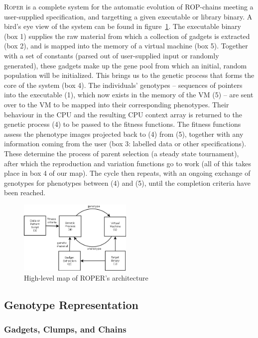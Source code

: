 \textsc{Roper} is a complete system for the automatic evolution of
ROP-chains meeting a user-supplied specification, and targetting a
given executable or library binary. A bird's eye view of the system
can be found in figure~\ref{fig:architecture}. The executable binary
(box 1) supplies the raw material from which a collection of gadgets
is extracted (box 2), and is mapped into the memory of a virtual
machine (box 5). Together with a set of constants (parsed out of
user-supplied input or randomly generated), these gadgets make up the
gene pool from which an initial, random population will be
initialized. This brings us to the genetic process that forms the core
of the system (box 4). The individuals' genotypes -- sequences of
pointers into the executable (1), which now exists in the memory of
the VM (5) -- are sent over to the VM to be mapped into their
corresponding phenotypes. Their behaviour in the CPU and the resulting
CPU context array is returned to the genetic process (4) to be passed
to the fitness functions. The fitness functions assess the phenotype
images projected back to (4) from (5), together with any information
coming from the user (box 3: labelled data or other specifications).
These determine the process of parent selection (a steady state
tournament), after which the reproduction and variation functions go
to work (all of this takes place in box 4 of our map). The cycle then
repeats, with an ongoing exchange of genotypes for phenotypes between
(4) and (5), until the completion criteria have been reached.

\begin{figure}
  \includegraphics[width=\columnwidth,height=3.5cm]{architecture.png}
  \caption{High-level map of ROPER's architecture}
  \label{fig:architecture}
\end{figure}

\subsection{Genotype Representation}


\subsubsection{Gadgets, Clumps, and Chains}

